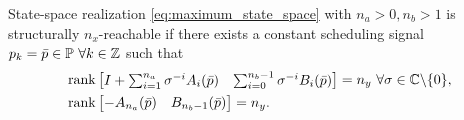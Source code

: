 \begin{theorem}
    \label{th:DT_controllability}
    State-space realization \eqref{eq:maximum_state_space} with $n_a > 0, n_b > 1$ is structurally $n_x$-reachable if there exists a constant scheduling signal $p_k = \bar{p} \in \mathbb{P} \ \forall k \in \mathbb{Z}$ such that
    \begin{subequations}
    \begin{align}
        &\textnormal{\textrm{rank}} \begin{bmatrix} I + \sum_{i=1}^{n_a} \sigma^{-i}A_i(\bar{p}) & \sum_{i=0}^{n_b-1} \sigma^{-i} B_i(\bar{p}) \end{bmatrix} = n_y \ \forall \sigma \in \mathbb{C} \backslash \{ 0 \}, \label{eq:coprime_theorem} \\
        &\textnormal{\textrm{rank}} \begin{bmatrix} -A_{n_a}(\bar{p}) & B_{n_b-1}(\bar{p}) \end{bmatrix} = n_y. \label{eq:last_coefficient_nullspace}
    \end{align}%
    \end{subequations}%
\end{theorem}
